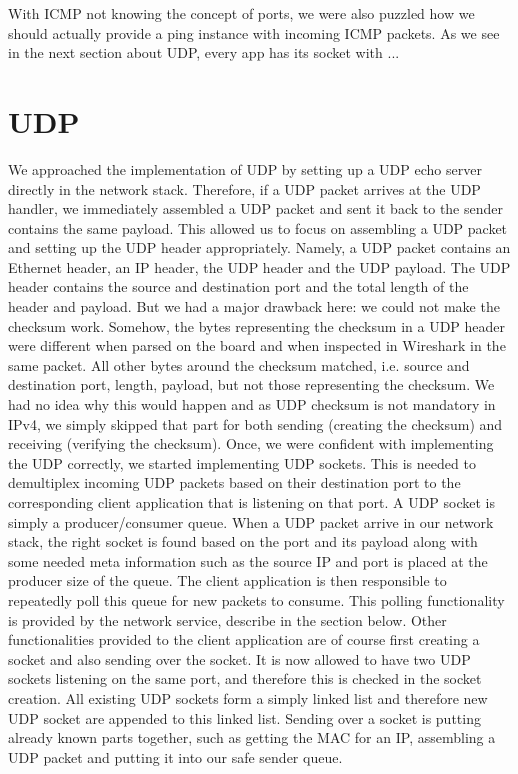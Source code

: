 With ICMP not knowing the concept of ports, we were also puzzled how we should
actually provide a ping instance with incoming ICMP packets. As we see in the
next section about UDP, every app has its socket with  ...


\section{UDP}

We approached the implementation of UDP by setting up a UDP echo server directly
in the network stack. Therefore, if a UDP packet arrives at the UDP handler, we
immediately assembled a UDP packet and sent it back to the sender contains the
same payload. This allowed us to focus on assembling a UDP packet and setting up
the UDP header appropriately. Namely, a UDP packet contains an Ethernet header,
an IP header, the UDP header and the UDP payload. The UDP header contains the
source and destination port and the total length of the header and payload.  But
we had a major drawback here: we could not make the checksum work. Somehow, the
bytes representing the checksum in a UDP header were different when parsed on
the board and when inspected in Wireshark in the same packet. All other bytes
around the checksum matched, i.e. source and destination port, length, payload,
but not those representing the checksum. We had no idea why this would happen
and as UDP checksum is not mandatory in IPv4, we simply skipped that part for
both sending (creating the checksum) and receiving (verifying the checksum).
Once, we were confident with implementing the UDP correctly, we started
implementing UDP sockets. This is needed to demultiplex incoming UDP packets
based on their destination port to the corresponding client application that is
listening on that port.  A UDP socket is simply a producer/consumer queue. When
a UDP packet arrive in our network stack, the right socket is found based on the
port and its payload along with some needed meta information such as the source
IP and port is placed at the producer size of the queue. The client application
is then responsible to repeatedly poll this queue for new packets to consume.
This polling functionality is provided by the network service, describe in the
section below.  Other functionalities provided to the client application are of
course first creating a socket and also sending over the socket. It is now
allowed to have two UDP sockets listening on the same port, and therefore this
is checked in the socket creation. All existing UDP sockets form a simply linked
list and therefore new UDP socket are appended to this linked list. Sending over
a socket is putting already known parts together, such as getting the MAC for an
IP, assembling a UDP packet and putting it into our safe sender queue.

